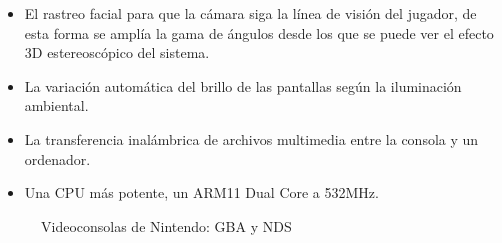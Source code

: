 \begin{itemize}
	\begin{itemize}
		\item El rastreo facial para que la cámara siga la línea de visión del jugador, de esta forma se amplía la gama de ángulos desde los que se puede ver el efecto 3D estereoscópico del sistema.
		\item La variación automática del brillo de las pantallas según la iluminación ambiental.
		\item La transferencia inalámbrica de archivos multimedia entre la consola y un ordenador.
		\item Una CPU más potente, un ARM11 Dual Core a 532MHz. 
	\end{itemize}	
\end{itemize}


\begin{figure}
	\centering
	\caption{Videoconsolas de Nintendo: GBA y NDS}
	\label{fig_c1_nintendo1}
\end{figure}

